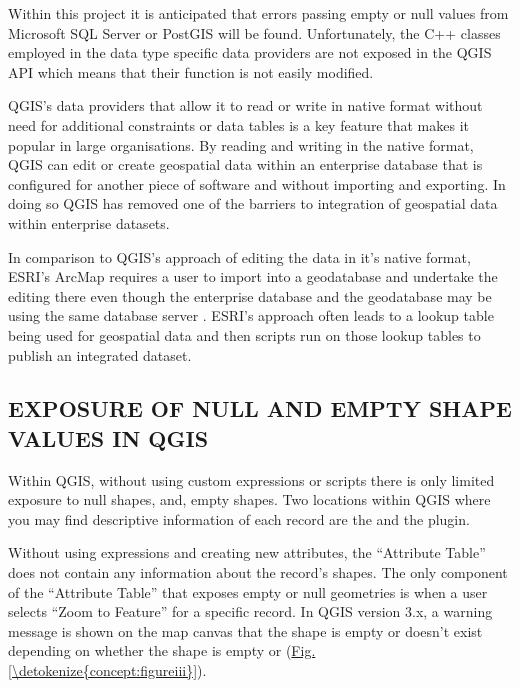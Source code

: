 \documentclass[letterpaper,10pt,english]{sphinxmanual}
\begin{document}
Within this project it is anticipated that errors passing empty or null values from Microsoft SQL Server or PostGIS will be found.  Unfortunately, the C++ classes employed in the data type specific data providers  are not exposed in the QGIS API which means that their function is not easily modified.

QGIS’s data providers that allow it to read or write in native format without need for additional constraints or data tables is a key feature that makes it popular in large organisations. By reading and writing in the native format, QGIS can edit or create geospatial data within an enterprise database that is configured for another piece of software and without importing and exporting.  In doing so QGIS has removed one of the barriers to integration of geospatial data within enterprise datasets.

In comparison to QGIS’s approach of editing the data in it’s native format, ESRI’s ArcMap requires a user to import into a geodatabase and undertake the editing there\textendash{} even though the enterprise database and the geodatabase may be using the same database server .  ESRI’s approach often leads to a lookup table being used for geospatial data and then scripts run on those lookup tables to publish an integrated dataset.


\subsection{EXPOSURE OF NULL AND EMPTY SHAPE VALUES IN QGIS}
\label{\detokenize{concept:exposure-of-null-and-empty-shape-values-in-qgis}}
Within QGIS, without using custom expressions or scripts there is only limited exposure to null shapes, and, empty shapes.  Two locations within QGIS where you may find descriptive information of each record are the  and the  plugin.

Without using expressions and creating new attributes, the “Attribute Table” does not contain any information about the record’s shapes.  The only component of the “Attribute Table” that exposes empty or null geometries is when a user selects “Zoom to Feature” for a specific record.  In QGIS version 3.x, a warning message is shown on the map canvas that the shape is empty or doesn’t exist depending on whether the shape is empty or  (\hyperref[\detokenize{concept:figureiii}]{Fig.\@ \ref{\detokenize{concept:figureiii}}}).
\end{document}
